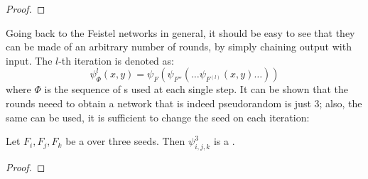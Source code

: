 \begin{proof}
\end{proof}

Going back to the Feistel networks in general, it should be easy to see that they can be made of an arbitrary number of rounds, by simply chaining output with input. The $l$-th iteration is denoted as: 
\[
    \psi^l_\Phi(x, y) = \psi_{F}(\psi_{F''}( \ldots \psi_{F^{(l)}}(x, y) \ldots ))
\]
where $\Phi$ is the sequence of \prf{}s used at each single step. It can be shown that the rounds neeed to obtain a network that is indeed pseudorandom is just 3; also, the same \prf{} can be used, it is sufficient to change the seed on each iteration\footnotemark:

\begin{theorem}
    Let $F_i, F_j, F_k$ be a \prf{} over three seeds. Then $\psi^3_{i, j, k}$ is a \prp.
\end{theorem}


\begin{proof}
\end{proof}
